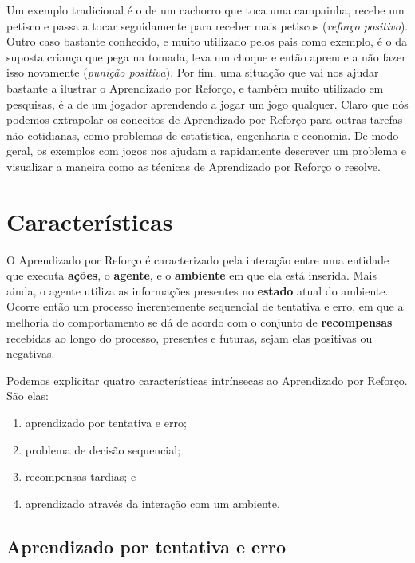 \documentclass{article}
\begin{document}
        Um exemplo tradicional é o de um cachorro que toca uma campainha, recebe um petisco e passa a tocar seguidamente para receber mais petiscos (\emph{reforço positivo}).
        Outro caso bastante conhecido, e muito utilizado pelos pais como exemplo, é o da suposta criança que pega na tomada, leva um choque e então aprende a não fazer isso novamente (\emph{punição positiva}).
        Por fim, uma situação que vai nos ajudar bastante a ilustrar o Aprendizado por Reforço, e também muito utilizado em pesquisas, é a de um jogador aprendendo a jogar um jogo qualquer.
        Claro que nós podemos extrapolar os conceitos de Aprendizado por Reforço para outras tarefas não cotidianas, como problemas de estatística, engenharia e economia.
        De modo geral, os exemplos com jogos nos ajudam a rapidamente descrever um problema e visualizar a maneira como as técnicas de Aprendizado por Reforço o resolve.
            
    \section{Características}
    
        O Aprendizado por Reforço é caracterizado pela interação entre uma entidade que executa \textbf{ações}, o \textbf{agente}, e o \textbf{ambiente} em que ela está inserida.
        Mais ainda, o agente utiliza as informações presentes no \textbf{estado} atual do ambiente.
        Ocorre então um processo inerentemente sequencial de tentativa e erro, em que a melhoria do comportamento se dá de acordo com o conjunto de \textbf{recompensas} recebidas ao longo do processo, presentes e futuras, sejam elas positivas ou negativas.
        
        Podemos explicitar quatro características intrínsecas ao Aprendizado por Reforço.
        São elas:
        
        \begin{enumerate}
            \item aprendizado por tentativa e erro;
            \item problema de decisão sequencial;
            \item recompensas tardias; e
            \item aprendizado através da interação com um ambiente.
        \end{enumerate}
        
        \subsection{Aprendizado por tentativa e erro}
        
\end{document}
